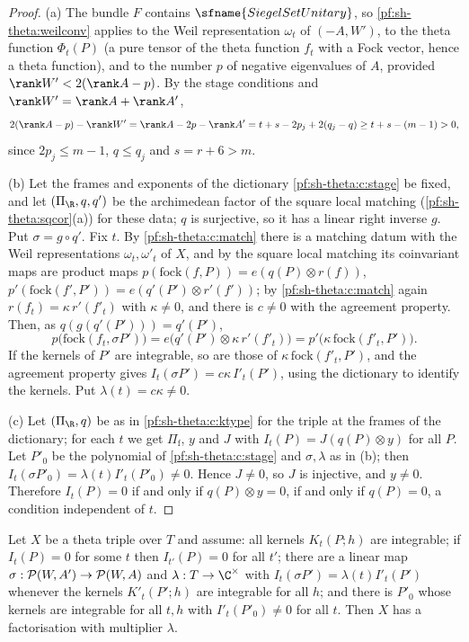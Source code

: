 \begin{proof}
(a) The bundle $F$ contains $\sfname{SiegelSetUnitary}$, so \cref{pf:sh-theta:weilconv} applies to the Weil representation
$\omega_t$ of $(-A,W')$, to the theta function $\Phi_t(P)$ (a pure tensor of the theta function $f_t$ with a Fock vector, hence a
theta function), and to the number $p$ of negative eigenvalues of $A$, provided $\rank W'<2(\rank A-p)$. By the stage conditions
and $\rank W'=\rank A+\rank A'$,
\[
2(\rank A-p)-\rank W'=\rank A-2p-\rank A'=t+s-2p_j+2(q_j-q)\ge t+s-(m-1)>0,
\]
since $2p_j\le m-1$, $q\le q_j$ and $s=r+6>m$.

(b) Let the frames and exponents of the dictionary \ref{pf:sh-theta:c:stage} be fixed, and let $(\Pi_\R,q,q')$ be the archimedean
factor of the square local matching (\cref{pf:sh-theta:sqcor}(a)) for these data; $q$ is surjective, so it has a linear right
inverse $g$. Put $\sigma=g\circ q'$. Fix $t$. By \ref{pf:sh-theta:c:match} there is a matching datum with the Weil representations
$\omega_t,\omega'_t$ of $X$, and by the square local matching its coinvariant maps are product maps $p(\mathrm{fock}(f,P))=
e(q(P)\otimes r(f))$, $p'(\mathrm{fock}(f',P'))=e(q'(P')\otimes r'(f'))$; by \ref{pf:sh-theta:c:match} again $r(f_t)=\kappa\,r'(f'_t)$ with
$\kappa\ne0$, and there is $c\ne0$ with the agreement property. Then, as $q(g(q'(P')))=q'(P')$,
\[
p\bigl(\mathrm{fock}(f_t,\sigma P')\bigr)=e\bigl(q'(P')\otimes\kappa\,r'(f'_t)\bigr)=p'\bigl(\kappa\,\mathrm{fock}(f'_t,P')\bigr).
\]
If the kernels of $P'$ are integrable, so are those of $\kappa\,\mathrm{fock}(f'_t,P')$, and the agreement property gives
$I_t(\sigma P')=c\kappa\,I'_t(P')$, using the dictionary to identify the kernels. Put $\lambda(t)=c\kappa\ne0$.

(c) Let $(\Pi_\R,q)$ be as in \ref{pf:sh-theta:c:ktype} for the triple at the frames of the dictionary; for each $t$ we get
$\Pi_{\mathrm f}$, $y$ and $J$ with $I_t(P)=J(q(P)\otimes y)$ for all $P$. Let $P'_0$ be the polynomial of \ref{pf:sh-theta:c:stage}
and $\sigma,\lambda$ as in (b); then $I_t(\sigma P'_0)=\lambda(t)I'_t(P'_0)\ne0$. Hence $J\ne0$, so $J$ is injective, and $y\ne0$.
Therefore $I_t(P)=0$ if and only if $q(P)\otimes y=0$, if and only if $q(P)=0$, a condition independent of $t$.
\end{proof}

\begin{lemma}\label{pf:sh-theta:parts}
Let $X$ be a theta triple over $T$ and assume: all kernels $K_t(P;h)$ are integrable; if $I_t(P)=0$ for some $t$ then
$I_{t'}(P)=0$ for all $t'$; there are a linear map $\sigma:\mathcal{P}(W,A')\to\mathcal{P}(W,A)$ and $\lambda:T\to\C^\times$ with
$I_t(\sigma P')=\lambda(t)I'_t(P')$ whenever the kernels $K'_t(P';h)$ are integrable for all $h$; and there is $P'_0$ whose kernels
are integrable for all $t,h$ with $I'_t(P'_0)\ne0$ for all $t$. Then $X$ has a factorisation with multiplier $\lambda$.
\end{lemma}

